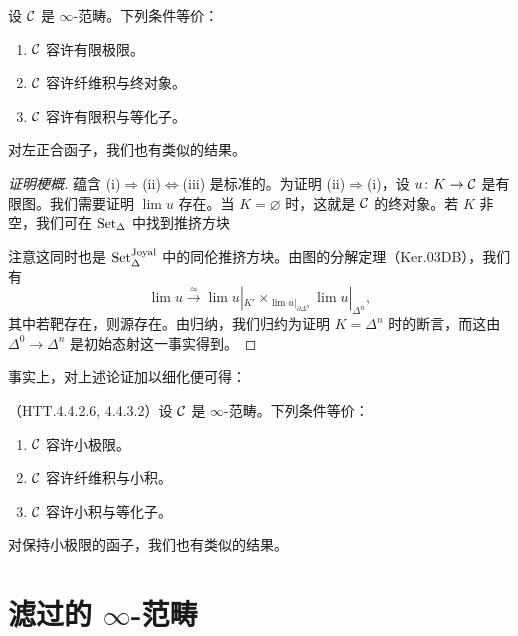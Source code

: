 \begin{proposition}\label{L10-1.13}
设 $\mathcal{C}$ 是 $\infty$-范畴。下列条件等价：
\begin{enumerate}[label=(\roman*),leftmargin=2.4em,itemsep=0.1em]
\item $\mathcal{C}$ 容许有限极限。
\item $\mathcal{C}$ 容许纤维积与终对象。
\item $\mathcal{C}$ 容许有限积与等化子。
\end{enumerate}
对左正合函子，我们也有类似的结果。
\end{proposition}

\begin{proof}[证明梗概]
蕴含 (i)$\Rightarrow$(ii)$\Leftrightarrow$(iii) 是标准的。为证明 (ii)$\Rightarrow$(i)，设 $u\colon K\to\mathcal{C}$ 是有限图。我们需要证明 $\lim u$ 存在。当 $K=\varnothing$ 时，这就是 $\mathcal{C}$ 的终对象。若 $K$ 非空，我们可在 $\operatorname{Set}_\Delta$ 中找到推挤方块
\begin{center}
\end{center}
注意这同时也是 $\operatorname{Set}^{\mathrm{Joyal}}_\Delta$ 中的同伦推挤方块。由图的分解定理（Ker.03DB），我们有
\[
\lim u\xrightarrow{\ \simeq\ }\lim u|_{K'}\times_{\lim u|_{\partial\Delta^n}}\lim u|_{\Delta^n},
\]
其中若靶存在，则源存在。由归纳，我们归约为证明 $K=\Delta^n$ 时的断言，而这由 $\Delta^0\to\Delta^n$ 是初始态射这一事实得到。
\end{proof}

\nitem\label{L10-1.14} 事实上，对上述论证加以细化便可得：

\begin{proposition}\label{L10-1.15}
（HTT.4.4.2.6, 4.4.3.2）设 $\mathcal{C}$ 是 $\infty$-范畴。下列条件等价：
\begin{enumerate}[label=(\roman*),leftmargin=2.4em,itemsep=0.1em]
\item $\mathcal{C}$ 容许小极限。
\item $\mathcal{C}$ 容许纤维积与小积。
\item $\mathcal{C}$ 容许小积与等化子。
\end{enumerate}
对保持小极限的函子，我们也有类似的结果。
\end{proposition}

\section{滤过的 $\infty$-范畴}


